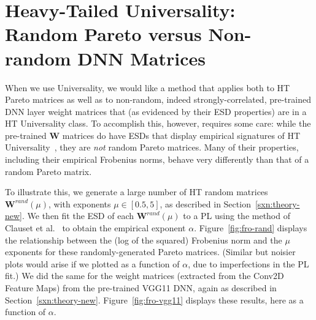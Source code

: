 

\section{Heavy-Tailed Universality: Random Pareto versus Non-random DNN Matrices} 
\label{sxn:appendix-universality}

When we use Universality, we would like a method that applies both to HT Pareto matrices as well as to non-random, indeed strongly-correlated, pre-trained DNN layer weight matrices that (as evidenced by their ESD properties) are in a HT Universality class.  
To accomplish this, however, requires some care: while the pre-trained $\mathbf{W}$ matrices do have ESDs that display empirical signatures of HT Universality~\cite{MM18_TR}, they are \emph{not} random Pareto matrices.
Many of their properties, including their empirical Frobenius norms, behave very differently than that of a random Pareto matrix.  

To illustrate this, we generate a large number of HT random matrices $\mathbf{W}^{rand}(\mu)$, with exponents $\mu\in[0.5, 5]$, as described in Section~\ref{sxn:theory-new}.
%
We then fit the ESD of each $\mathbf{W}^{rand}(\mu)$ to a PL using the method of Clauset et al.~\cite{CSN09_powerlaw,ABP14} to obtain the empirical exponent $\alpha$. 
Figure~\ref{fig:fro-rand} displays the relationship between the (log of the squared) Frobenius norm and the $\mu$ exponents for these randomly-generated Pareto matrices.
(Similar but noisier plots would arise if we plotted as a function of $\alpha$, due to imperfections in the PL fit.)
We did the same for the weight matrices (extracted from the Conv2D Feature Maps) from the pre-trained VGG11 DNN, again as described in Section~\ref{sxn:theory-new}.
Figure~\ref{fig:fro-vgg11} displays these results, here as a function of $\alpha$.

